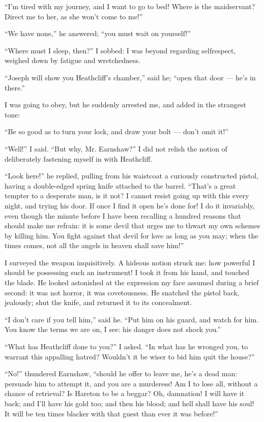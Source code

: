 \par “I'm tired with my journey, and I want to go to bed! Where is the maidservant? Direct me to her, as she won't come to me!”
\par “We have none,” he answered; “you must wait on yourself!”
\par “Where must I sleep, then?” I sobbed: I was beyond regarding selfrespect, weighed down by fatigue and wretchedness.
\par “Joseph will show you Heathcliff's chamber,” said he; “open that door — he's in there.”
\par I was going to obey, but he suddenly arrested me, and added in the strangest tone:
\par “Be so good as to turn your lock, and draw your bolt — don't omit it!”
\par “Well!” I said. “But why, Mr. Earnshaw?” I did not relish the notion of deliberately fastening myself in with Heathcliff.
\par “Look here!” he replied, pulling from his waistcoat a curiously constructed pistol, having a double-edged spring knife attached to the barrel. “That's a great tempter to a desperate man, is it not? I cannot resist going up with this every night, and trying his door. If once I find it open he's done for! I do it invariably, even though the minute before I have been recalling a hundred reasons that should make me refrain: it is some devil that urges me to thwart my own schemes by killing him. You fight against that devil for love as long as you may; when the times comes, not all the angels in heaven shall save him!”
\par I surveyed the weapon inquisitively. A hideous notion struck me: how powerful I should be possessing such an instrument! I took it from his hand, and touched the blade. He looked astonished at the expression my face assumed during a brief second: it was not horror, it was covetousness. He snatched the pistol back, jealously; shut the knife, and returned it to its concealment.
\par “I don't care if you tell him,” said he. “Put him on his guard, and watch for him. You know the terms we are on, I see: his danger does not shock you.”
\par “What has Heathcliff done to you?” I asked. “In what has he wronged you, to warrant this appalling hatred? Wouldn't it be wiser to bid him quit the house?”
\par “No!” thundered Earnshaw, “should he offer to leave me, he's a dead man: persuade him to attempt it, and you are a murderess! Am I to lose all, without a chance of retrieval? Is Hareton to be a beggar? Oh, damnation! I will have it back; and I'll have his gold too; and then his blood; and hell shall have his soul! It will be ten times blacker with that guest than ever it was before!”
